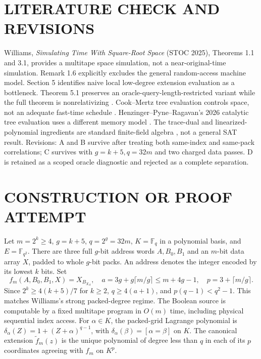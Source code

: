 \documentclass[11pt]{article}
\begin{document}
\section{LITERATURE CHECK AND REVISIONS}
Williams, \emph{Simulating Time With Square-Root Space} (STOC 2025), Theorems 1.1 and 3.1, provides a multitape space simulation, not a near-original-time simulation. Remark 1.6 explicitly excludes the general random-access machine model. Section 5 identifies naive local low-degree extension evaluation as a bottleneck. Theorem 5.1 preserves an oracle-query-length-restricted variant while the full theorem is nonrelativizing \cite{Wil}. Cook--Mertz tree evaluation controls space, not an adequate fast-time schedule \cite{CM}. Henzinger--Pyne--Ragavan's 2026 catalytic tree evaluation uses a different memory model \cite{HPR}. The trace-dual and linearized-polynomial ingredients are standard finite-field algebra \cite{LN}, not a general SAT result. Revisions: A and B survive after treating both same-index and same-pack correlations; C survives with $g=k+5,q=32m$ and two charged data passes. D is retained as a scoped oracle diagnostic and rejected as a complete separation.

\section{CONSTRUCTION OR PROOF ATTEMPT}
Let $m=2^k\ge4$, $g=k+5$, $q=2^g=32m$, $K=\mathbb F_q$ in a polynomial basis, and $E=\mathbb F_{q^2}$. There are three full $g$-bit address words $A,B_0,B_1$ and an $m$-bit data array $X$, padded to whole $g$-bit packs. An address denotes the integer encoded by its lowest $k$ bits. Set
\[
 f_m(A,B_0,B_1,X)=X_{B_{X_A}},\quad
 a=3g+g\lceil m/g\rceil\le m+4g-1,\quad p=3+\lceil m/g\rceil.
\]
Since $2^k\ge4(k+5)/7$ for $k\ge2$, $q\ge4(a+1)$, and $p(q-1)<q^2-1$. This matches Williams's strong packed-degree regime. The Boolean source is computable by a fixed multitape program in $O(m)$ time, including physical sequential index access. For $\alpha\in K$, the packed-grid Lagrange polynomial is $\delta_\alpha(Z)=1+(Z+\alpha)^{q-1}$, with $\delta_\alpha(\beta)=[\alpha=\beta]$ on $K$. The canonical extension $\widetilde f_m(z)$ is the unique polynomial of degree less than $q$ in each of its $p$ coordinates agreeing with $f_m$ on $K^p$.
\end{document}

